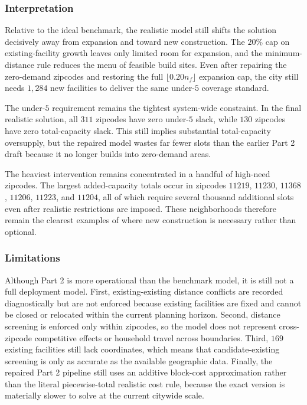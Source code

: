 \documentclass[11pt]{article}
\newcommand{\1}{\mathbb{I}}
\begin{document}
\subsubsection{Interpretation}

Relative to the ideal benchmark, the realistic model still shifts the solution decisively away from expansion and toward new construction. The \(20\%\) cap on existing-facility growth leaves only limited room for expansion, and the minimum-distance rule reduces the menu of feasible build sites. Even after repairing the zero-demand zipcodes and restoring the full \(\lfloor 0.20 n_f \rfloor\) expansion cap, the city still needs \(1{,}284\) new facilities to deliver the same under-\(5\) coverage standard.

The under-\(5\) requirement remains the tightest system-wide constraint. In the final realistic solution, all \(311\) zipcodes have zero under-\(5\) slack, while \(130\) zipcodes have zero total-capacity slack. This still implies substantial total-capacity oversupply, but the repaired model wastes far fewer slots than the earlier Part 2 draft because it no longer builds into zero-demand areas.

The heaviest intervention remains concentrated in a handful of high-need zipcodes. The largest added-capacity totals occur in zipcodes \(11219\), \(11230\), \(11368\), \(11206\), \(11223\), and \(11204\), all of which require several thousand additional slots even after realistic restrictions are imposed. These neighborhoods therefore remain the clearest examples of where new construction is necessary rather than optional.

\subsubsection{Limitations}

Although Part 2 is more operational than the benchmark model, it is still not a full deployment model. First, existing-existing distance conflicts are recorded diagnostically but are not enforced because existing facilities are fixed and cannot be closed or relocated within the current planning horizon. Second, distance screening is enforced only within zipcodes, so the model does not represent cross-zipcode competitive effects or household travel across boundaries. Third, \(169\) existing facilities still lack coordinates, which means that candidate-existing screening is only as accurate as the available geographic data. Finally, the repaired Part 2 pipeline still uses an additive block-cost approximation rather than the literal piecewise-total realistic cost rule, because the exact version is materially slower to solve at the current citywide scale.
\end{document}
